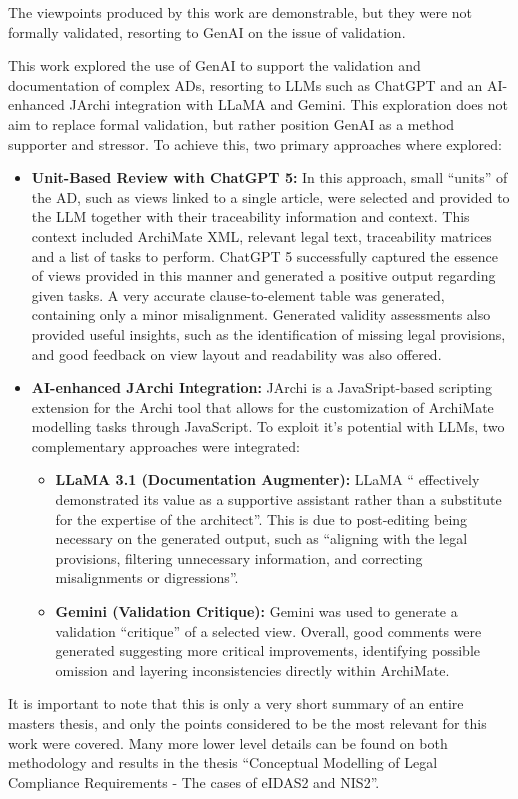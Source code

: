 The viewpoints produced by this work are demonstrable, but they were not formally validated, resorting to \ac{GenAI} on the issue of validation.

This work explored the use of \ac{GenAI} to support the validation and documentation of complex \ac{AD}s, resorting to \ac{LLM}s such as ChatGPT and an AI-enhanced JArchi integration with LLaMA and Gemini. This exploration does not aim to replace formal validation, but rather position \ac{GenAI} as a method supporter and stressor.
To achieve this, two primary approaches where explored:

\begin{itemize}
    \item \textbf{Unit-Based Review with ChatGPT 5:}  In this approach, small ``units'' of the \ac{AD}, such as views linked to a single article, were selected and provided to the \ac{LLM} together with their traceability information and context. This context included ArchiMate XML, relevant legal text, traceability matrices and a list of tasks to perform. ChatGPT 5 successfully captured the essence of views provided in this manner and generated a positive output regarding given tasks. A very accurate clause-to-element table was generated, containing only a minor misalignment. Generated validity assessments also provided useful insights, such as the identification of missing legal provisions, and good feedback on view layout and readability was also offered.
    \item \textbf{AI-enhanced JArchi Integration:} JArchi is a JavaSript-based scripting extension for the Archi tool that allows for the customization of ArchiMate modelling tasks through JavaScript. To exploit it's potential with \ac{LLM}s, two complementary approaches were integrated:
    \begin{itemize}
        \item \textbf{LLaMA 3.1 (Documentation Augmenter):} LLaMA `` effectively demonstrated its value as a supportive assistant rather than a substitute for the expertise of the architect''\cite{Pbol}. This is due to post-editing being necessary on the generated output, such as ``aligning with the legal provisions, filtering unnecessary information, and correcting misalignments or digressions''\cite{Pbol}.
        \item \textbf{Gemini (Validation Critique):} Gemini was used to generate a validation ``critique'' of a selected view. Overall, good comments were generated suggesting more critical improvements, identifying possible omission and layering inconsistencies directly within ArchiMate.
    \end{itemize}
\end{itemize}

It is important to note that this is only a very short summary of an entire masters thesis, and only the points considered to be the most relevant for this work were covered. Many more lower level details can be found on both methodology and results in the thesis ``Conceptual Modelling of Legal Compliance Requirements - The cases of eIDAS2 and NIS2''. 


